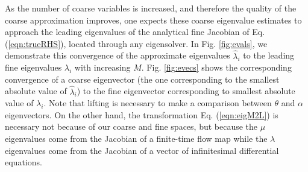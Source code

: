 \documentclass[numbers]{frontiersSCNS}
\newcommand{\numCofs}{{M}}
\newcommand{\trueEig}{\lambda}
\newcommand{\coarseApproxdEig}{{\hat{\lambda}}}
\newcommand{\coarseEig}{{\mu}}
\newcommand{\figRef}[1]{Fig. \ref{fig:#1}}
\newcommand{\eqnRef}[1]{Eq. (\ref{eqn:#1})}
\begin{document}
As the number of coarse variables is increased,
and therefore the quality of the coarse approximation improves,
one expects these coarse eigenvalue estimates to approach the leading eigenvalues of
the analytical fine Jacobian 
of \eqnRef{trueRHS}, located through any eigensolver.
%
In \figRef{evals}, we demonstrate
this convergence of the approximate eigenvalues $\coarseApproxdEig_i$ to 
the leading fine eigenvalues $\trueEig_i$
with increasing $\numCofs$.
%
\figRef{evecs} shows the corresponding
convergence of a coarse eigenvector (the one
corresponding to the smallest absolute value of $\coarseApproxdEig_i$)
to 
the fine eigenvector corresponding to smallest absolute value of $\trueEig_i$.
%
Note that lifting is necessary to make a comparison between $\theta$ and $\alpha$ eigenvectors.
%
On the other hand, the transformation \eqnRef{eigM2L} is necessary
not because of our coarse and fine spaces,
but because the $\coarseEig$ eigenvalues come from the Jacobian of a finite-time flow map
while the $\trueEig$ eigenvalues come from the Jacobian of a vector of infinitesimal differential equations.
%
%
\end{document}
